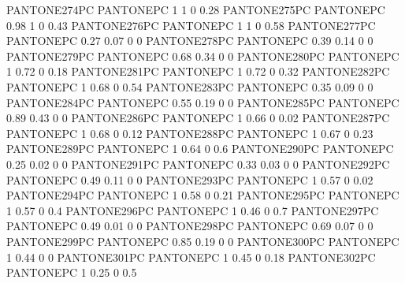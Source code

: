  {PANTONE274PC} {PANTONE\SpotSpace PC} {1 1 0 0.28}
 {PANTONE275PC} {PANTONE\SpotSpace PC} {0.98 1 0 0.43}
 {PANTONE276PC} {PANTONE\SpotSpace PC} {1 1 0 0.58}
 {PANTONE277PC} {PANTONE\SpotSpace PC} {0.27 0.07 0 0}
 {PANTONE278PC} {PANTONE\SpotSpace PC} {0.39 0.14 0 0}
 {PANTONE279PC} {PANTONE\SpotSpace PC} {0.68 0.34 0 0}
 {PANTONE280PC} {PANTONE\SpotSpace PC} {1 0.72 0 0.18}
 {PANTONE281PC} {PANTONE\SpotSpace PC} {1 0.72 0 0.32}
 {PANTONE282PC} {PANTONE\SpotSpace PC} {1 0.68 0 0.54}
 {PANTONE283PC} {PANTONE\SpotSpace PC} {0.35 0.09 0 0}
 {PANTONE284PC} {PANTONE\SpotSpace PC} {0.55 0.19 0 0}
 {PANTONE285PC} {PANTONE\SpotSpace PC} {0.89 0.43 0 0}
 {PANTONE286PC} {PANTONE\SpotSpace PC} {1 0.66 0 0.02}
 {PANTONE287PC} {PANTONE\SpotSpace PC} {1 0.68 0 0.12}
 {PANTONE288PC} {PANTONE\SpotSpace PC} {1 0.67 0 0.23}
 {PANTONE289PC} {PANTONE\SpotSpace PC} {1 0.64 0 0.6}
 {PANTONE290PC} {PANTONE\SpotSpace PC} {0.25 0.02 0 0}
 {PANTONE291PC} {PANTONE\SpotSpace PC} {0.33 0.03 0 0}
 {PANTONE292PC} {PANTONE\SpotSpace PC} {0.49 0.11 0 0}
 {PANTONE293PC} {PANTONE\SpotSpace PC} {1 0.57 0 0.02}
 {PANTONE294PC} {PANTONE\SpotSpace PC} {1 0.58 0 0.21}
 {PANTONE295PC} {PANTONE\SpotSpace PC} {1 0.57 0 0.4}
 {PANTONE296PC} {PANTONE\SpotSpace PC} {1 0.46 0 0.7}
 {PANTONE297PC} {PANTONE\SpotSpace PC} {0.49 0.01 0 0}
 {PANTONE298PC} {PANTONE\SpotSpace PC} {0.69 0.07 0 0}
 {PANTONE299PC} {PANTONE\SpotSpace PC} {0.85 0.19 0 0}
 {PANTONE300PC} {PANTONE\SpotSpace PC} {1 0.44 0 0}
 {PANTONE301PC} {PANTONE\SpotSpace PC} {1 0.45 0 0.18}
 {PANTONE302PC} {PANTONE\SpotSpace PC} {1 0.25 0 0.5}
